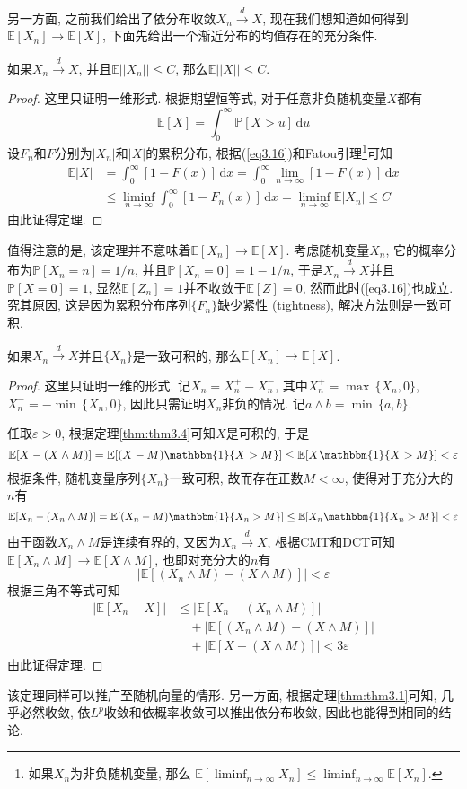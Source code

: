 \documentclass[cn, 12pt, math=mtpro2, bibstyle=apa, blue, twocol]{elegantbook}
\newcommand{\E}{\mathbb{E}}
\newcommand{\PP}{\mathbb{P}}
\newcommand{\limn}{\lim_{n\to\infty}}
\begin{document}
另一方面, 之前我们给出了依分布收敛$X_n\xrightarrow{d}X$, 现在我们想知道如何得到$\E[X_n]\to\E[X]$, 下面先给出一个渐近分布的均值存在的充分条件.
\begin{theorem}\label{thm:thm3.4}
  如果$X_n\xrightarrow{d}X$, 并且$\E||X_n||\leq C$, 那么$\E||X||\leq C$.
\end{theorem}
\begin{proof}
  这里只证明一维形式. 根据期望恒等式, 对于任意非负随机变量$X$都有
  \begin{equation}\label{eq3.16}
    \E[X]=\int_{0}^{\infty}\PP[X>u]\,\text{d}u
  \end{equation}
  设$F_n$和$F$分别为$|X_n|$和$|X|$的累积分布, 根据(\ref{eq3.16})和Fatou引理\footnote{如果$X_n$为非负随机变量, 那么
  $\displaystyle\E\left[\liminf_{n\to\infty}X_n\right]\leq\liminf_{n\to\infty}\E[X_n]$.}可知
  \begin{align*}
  \E|X|&=\int_{0}^{\infty}[1-F(x)]\,\text{d}x=\int_{0}^{\infty}\limn[1-F(x)]\,\text{d}x \\
  &\leq\liminf_{n\to\infty}\int_{0}^{\infty}[1-F_n(x)]\,\text{d}x=\liminf_{n\to\infty}\E|X_n|\leq C
  \end{align*}
  由此证得定理.
\end{proof}
值得注意的是, 该定理并不意味着$\E[X_n]\to\E[X]$. 考虑随机变量$X_n$, 它的概率分布为$\PP[X_n=n]=1/n$, 并且$\PP[X_n=0]=1-1/n$, 于是$X_n\xrightarrow{d}X$并且$\PP[X=0]=1$, 显然$\E[Z_n]=1$并不收敛于$\E[Z]=0$, 然而此时(\ref{eq3.16})也成立. 究其原因, 这是因为累积分布序列$\{F_n\}$缺少紧性 (tightness), 解决方法则是一致可积.
\begin{theorem}\label{thm:thm3.5}
  如果$X_n\xrightarrow{d}X$并且$\{X_n\}$是一致可积的, 那么$\E[X_n]\to\E[X]$.
\end{theorem}
\begin{proof}
  这里只证明一维的形式. 记$X_n=X_n^+-X_n^-$, 其中$X_n^+=\max\,\{X_n,0\}$, $X_n^-=-\min\,\{X_n,0\}$, 因此只需证明$X_n$非负的情况. 记$a\wedge b=\min\,\{a,b\}$.

  任取$\varepsilon>0$, 根据定理\ref{thm:thm3.4}可知$X$是可积的, 于是
  $$\E[X-(X\wedge M)]=\E[(X-M)\mathbbm{1}\{X>M\}]\leq\E[X\mathbbm{1}\{X>M\}]<\varepsilon$$
  根据条件, 随机变量序列$\{X_n\}$一致可积, 故而存在正数$M<\infty$, 使得对于充分大的$n$有
  $$\E[X_n-(X_n\wedge M)]=\E[(X_n-M)\mathbbm{1}\{X_n>M\}]\leq\E[X_n\mathbbm{1}\{X_n>M\}]<\varepsilon$$
  由于函数$X_n\wedge M$是连续有界的, 又因为$X_n\xrightarrow{d}X$, 根据CMT和DCT可知$\E[X_n\wedge M]\to\E[X\wedge M]$, 也即对充分大的$n$有
  $$|\E[(X_n\wedge M)-(X\wedge M)]|<\varepsilon$$
  根据三角不等式可知
  \begin{align*}
  |\E[X_n-X]|&\leq|\E[X_n-(X_n\wedge M)]|\\
  &\quad+|\E[(X_n\wedge M)-(X\wedge M)]|\\
  &\quad+|\E[X-(X\wedge M)]|<3\varepsilon
  \end{align*}
  由此证得定理.
\end{proof}
\begin{remark}
该定理同样可以推广至随机向量的情形. 另一方面, 根据定理\ref{thm:thm3.1}可知, 几乎必然收敛, 依$L^p$收敛和依概率收敛可以推出依分布收敛, 因此也能得到相同的结论.
\end{remark}
\end{document}
